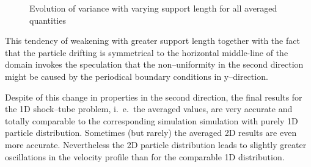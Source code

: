 \documentclass[11pt,a4paper,twoside]{report}
\begin{document}
\begin{figure}[!htbp]
\centering
\label{fig:2DSPHresults_CS_varianceVersusSuplen}

\caption[]{Evolution of variance with varying support length for all averaged quantities}

\end{figure}

This tendency of weakening with greater support length together with the fact that the particle drifting is symmetrical to the horizontal middle-line of the domain invokes the speculation that the non--uniformity in the second direction might be caused by the periodical boundary conditions in y--direction.


 
Despite of this change in properties in the second direction, the final results for the 1D shock--tube problem, i.\ e.\ the averaged values, are very accurate and totally comparable to the corresponding simulation simulation with purely 1D particle distribution. Sometimes (but rarely) the averaged 2D results are even more accurate.
Nevertheless the 2D particle distribution leads to slightly greater oscillations in the velocity profile than for the comparable 1D distribution.
 
\end{document}
